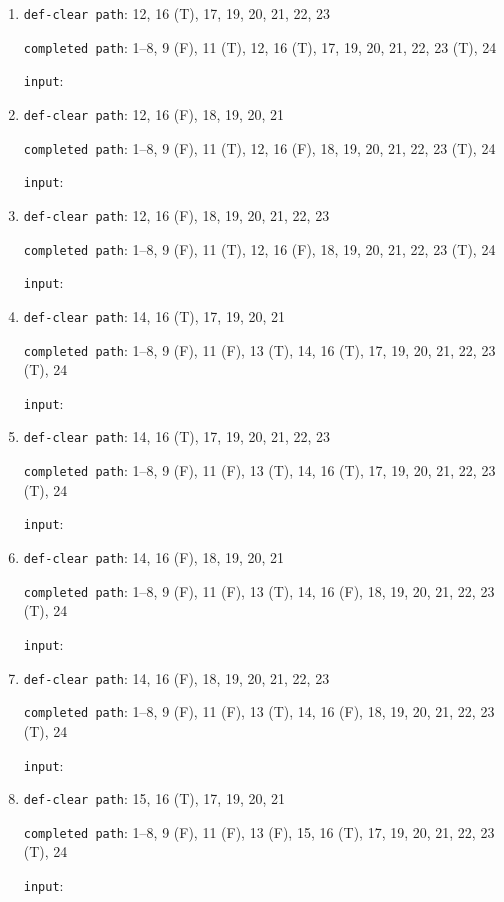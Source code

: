 \documentclass{article}
\begin{document}
\begin{enumerate}
    \item \texttt{def-clear path}: 12, 16 (T), 17, 19, 20, 21, 22, 23
          \par \texttt{completed path}: 1--8, 9 (F), 11 (T), 12, 16 (T), 17, 19, 20, 21, 22, 23 (T), 24
          \par \texttt{input}:

    \item \texttt{def-clear path}: 12, 16 (F), 18, 19, 20, 21
          \par \texttt{completed path}: 1--8, 9 (F), 11 (T), 12, 16 (F), 18, 19, 20, 21, 22, 23 (T), 24
          \par \texttt{input}:

    \item \texttt{def-clear path}: 12, 16 (F), 18, 19, 20, 21, 22, 23
          \par \texttt{completed path}: 1--8, 9 (F), 11 (T), 12, 16 (F), 18, 19, 20, 21, 22, 23 (T), 24
          \par \texttt{input}:

    \item \texttt{def-clear path}: 14, 16 (T), 17, 19, 20, 21
          \par \texttt{completed path}: 1--8, 9 (F), 11 (F), 13 (T), 14, 16 (T), 17, 19, 20, 21, 22, 23 (T), 24
          \par \texttt{input}:

    \item \texttt{def-clear path}: 14, 16 (T), 17, 19, 20, 21, 22, 23
          \par \texttt{completed path}: 1--8, 9 (F), 11 (F), 13 (T), 14, 16 (T), 17, 19, 20, 21, 22, 23 (T), 24
          \par \texttt{input}:

    \item \texttt{def-clear path}: 14, 16 (F), 18, 19, 20, 21
          \par \texttt{completed path}: 1--8, 9 (F), 11 (F), 13 (T), 14, 16 (F), 18, 19, 20, 21, 22, 23 (T), 24
          \par \texttt{input}:

    \item \texttt{def-clear path}: 14, 16 (F), 18, 19, 20, 21, 22, 23
          \par \texttt{completed path}: 1--8, 9 (F), 11 (F), 13 (T), 14, 16 (F), 18, 19, 20, 21, 22, 23 (T), 24
          \par \texttt{input}:

    \item \texttt{def-clear path}: 15, 16 (T), 17, 19, 20, 21
          \par \texttt{completed path}: 1--8, 9 (F), 11 (F), 13 (F), 15, 16 (T), 17, 19, 20, 21, 22, 23 (T), 24
          \par \texttt{input}:


\end{enumerate}
\end{document}
